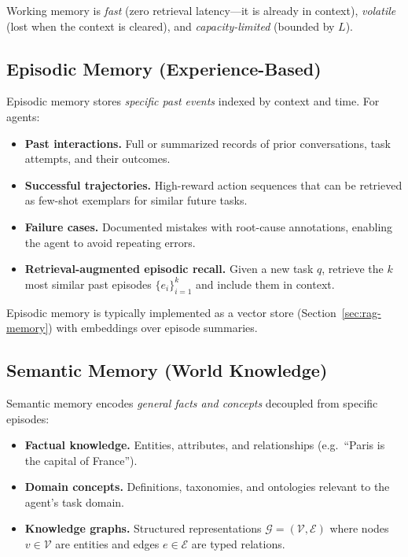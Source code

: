 Working memory is \emph{fast} (zero retrieval latency---it is already in context), \emph{volatile} (lost when the context is cleared), and \emph{capacity-limited} (bounded by $L$).

\subsection{Episodic Memory (Experience-Based)}
\label{episodic-memory-experience-based}

Episodic memory stores \emph{specific past events} indexed by context and time. For agents:

\begin{itemize}
  \item \textbf{Past interactions.} Full or summarized records of prior conversations, task attempts, and their outcomes.
  \item \textbf{Successful trajectories.} High-reward action sequences that can be retrieved as few-shot exemplars for similar future tasks.
  \item \textbf{Failure cases.} Documented mistakes with root-cause annotations, enabling the agent to avoid repeating errors.
  \item \textbf{Retrieval-augmented episodic recall.} Given a new task $q$, retrieve the $k$ most similar past episodes $\{e_i\}_{i=1}^k$ and include them in context.
\end{itemize}

Episodic memory is typically implemented as a vector store (Section~\ref{sec:rag-memory}) with embeddings over episode summaries.

\subsection{Semantic Memory (World Knowledge)}
\label{semantic-memory-world-knowledge}

Semantic memory encodes \emph{general facts and concepts} decoupled from specific episodes:

\begin{itemize}
  \item \textbf{Factual knowledge.} Entities, attributes, and relationships (e.g.~``Paris is the capital of France'').
  \item \textbf{Domain concepts.} Definitions, taxonomies, and ontologies relevant to the agent’s task domain.
  \item \textbf{Knowledge graphs.} Structured representations $\mathcal{G} = (\mathcal{V}, \mathcal{E})$ where nodes $v \in \mathcal{V}$ are entities and edges $e \in \mathcal{E}$ are typed relations.
\end{itemize}

